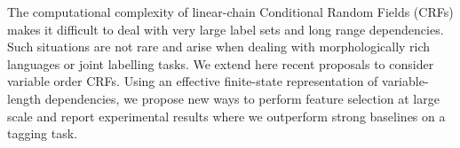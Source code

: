 The computational complexity of linear-chain Conditional Random Fields (CRFs) makes it difficult to deal with very large label sets and long range dependencies. Such situations are not rare and arise when dealing with morphologically rich languages or joint labelling tasks. We extend here recent proposals to consider variable order CRFs. Using an effective finite-state representation of variable-length dependencies, we propose new ways to perform feature selection at large scale and report experimental results where we outperform strong baselines on a tagging task.
